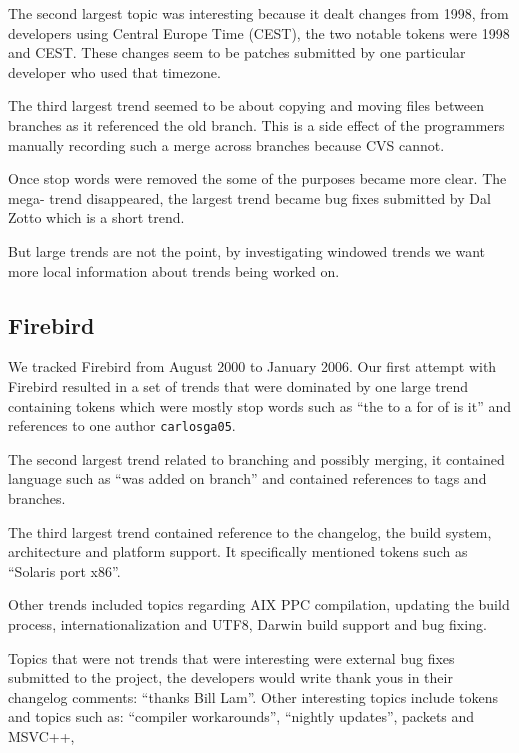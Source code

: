 \documentclass[times, 10pt,twocolumn]{article}
\begin{document}
The second largest topic was interesting because it dealt changes from
1998, from developers using Central Europe Time (CEST), the two
notable tokens were 1998 and CEST. These changes seem to be patches
submitted by one particular developer who used that timezone.

The third largest trend seemed to be about copying and moving files
between branches as it referenced the old branch. This is a side
effect of the programmers manually recording such a merge across
branches because CVS cannot.

Once stop words were removed the some of the purposes became more
clear. The mega- trend disappeared, the largest trend became bug fixes
submitted by Dal Zotto which is a short trend.



But large trends are not the point, by investigating windowed trends
we want more local information about trends being worked on.

\subsection{Firebird}


We tracked Firebird from August 2000 to January 2006.
Our first attempt with Firebird resulted in a set of trends that were
dominated by one large trend containing tokens which were mostly stop
words such as ``the to a for of is it'' and references to one author
\texttt{carlosga05}. 

The second largest trend related to branching and possibly merging, it
contained language such as ``was added on branch'' and contained
references to tags and branches.

The third largest trend contained reference to the changelog, the
build system, architecture and platform support. It specifically
mentioned tokens such as ``Solaris port x86''.

Other trends included topics regarding AIX PPC compilation, updating
the build process, internationalization and UTF8, Darwin build support
and bug fixing.

Topics that were not trends that were interesting were external bug
fixes submitted to the project, the developers would write thank yous
in their changelog comments: ``thanks Bill Lam''. Other interesting
topics include tokens and topics such as: ``compiler workarounds'', ``nightly updates'', packets and MSVC++, 
\end{document}
